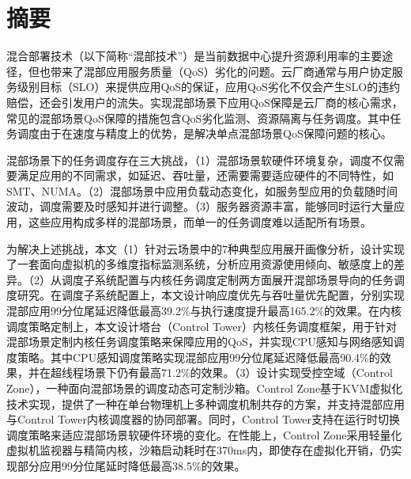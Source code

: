 
\maketitle%
\MAKETITLE%
\makedeclaration%
\intobmk\chapter*{摘\quad 要}%
\setcounter{page}{1}%


混合部署技术（以下简称“混部技术”）是当前数据中心提升资源利用率的主要途径，但也带来了混部应用服务质量（QoS）劣化的问题。云厂商通常与用户协定服务级别目标（SLO）来提供应用QoS的保证，应用QoS劣化不仅会产生SLO的违约赔偿，还会引发用户的流失。实现混部场景下应用QoS保障是云厂商的核心需求，常见的混部场景QoS保障的措施包含QoS劣化监测、资源隔离与任务调度。其中任务调度由于在速度与精度上的优势，是解决单点混部场景QoS保障问题的核心。

混部场景下的任务调度存在三大挑战，（1）混部场景软硬件环境复杂，调度不仅需要满足应用的不同需求，如延迟、吞吐量，还需要需要适应硬件的不同特性，如SMT、NUMA。（2）混部场景中应用负载动态变化，如服务型应用的负载随时间波动，调度需要及时感知并进行调整。（3）服务器资源丰富，能够同时运行大量应用，这些应用构成多样的混部场景，而单一的任务调度难以适配所有场景。

为解决上述挑战，本文（1）针对云场景中的7种典型应用展开画像分析，设计实现了一套面向虚拟机的多维度指标监测系统，分析应用资源使用倾向、敏感度上的差异。（2）从调度子系统配置与内核任务调度定制两方面展开混部场景导向的任务调度研究。在调度子系统配置上，本文设计响应度优先与吞吐量优先配置，分别实现混部应用99分位尾延迟降低最高39.2\%与执行速度提升最高165.2\%的效果。在内核调度策略定制上，本文设计塔台（Control Tower）内核任务调度框架，用于针对混部场景定制内核任务调度策略来保障应用的QoS，并实现CPU感知与网络感知调度策略。其中CPU感知调度策略实现混部应用99分位尾延迟降低最高90.4\%的效果，并在超线程场景下仍有最高71.2\%的效果。（3）设计实现受控空域（Control Zone），一种面向混部场景的调度动态可定制沙箱。Control Zone基于KVM虚拟化技术实现，提供了一种在单台物理机上多种调度机制共存的方案，并支持混部应用与Control Tower内核调度器的协同部署。同时，Control Tower支持在运行时切换调度策略来适应混部场景软硬件环境的变化。在性能上，Control Zone采用轻量化虚拟机监视器与精简内核，沙箱启动耗时在370ms内，即使存在虚拟化开销，仍实现部分应用99分位尾延时降低最高38.5\%的效果。


